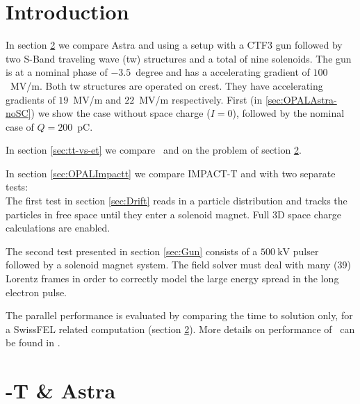 \documentclass{psi-note}    %
\begin{document}
 
\section{Introduction}

In section \ref{sec:OPALAstra} we compare Astra and \opalt using a setup
with a CTF3 gun \cite{CTF3Gun} followed by two S-Band traveling wave (tw)
structures and a total of nine solenoids. The gun is at a nominal phase of $-3.5$~degree and has a
accelerating gradient of $100$~MV/m. Both tw structures are operated on crest. They have
accelerating gradients of $19$~MV/m and $22$~MV/m respectively. First (in \ref{sec:OPALAstra-noSC}) we show the case without space charge ($I=0$), followed by
the nominal case of $Q=200$~pC.


In section \ref{sec:tt-vs-et} we compare \opalt\ and \opale on the problem of section \ref{sec:OPALAstra}.

In section \ref{sec:OPALImpactt} we compare IMPACT-T and \opalt with two
separate tests:\\ 
The first test in section \ref{sec:Drift} reads in a particle distribution and
tracks the particles in free space until they enter a solenoid magnet. Full 3D
space charge calculations are enabled.

The second test presented in section \ref{sec:Gun} consists of a $500~\mbox{kV}$ 
pulser followed by a solenoid magnet system. The field solver must deal with
many (39) Lorentz frames in order to correctly model the large energy spread in
the long electron pulse.

The parallel performance is evaluated by comparing the time
to solution only, for a SwissFEL related computation (section
\ref{sec:OPALAstra}). More details on performance of \opal\ can be found in
\cite{PhysRevSTAB.13.064201,Adelmann20104554}.

\section{\opal-T \& Astra} \label{sec:OPALAstra}
\end{document}
